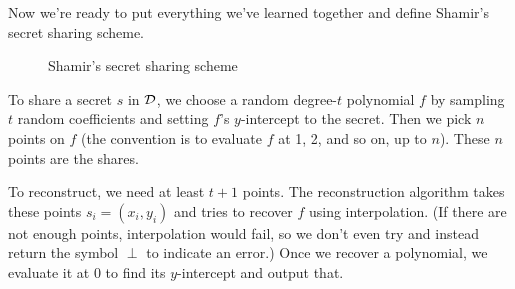 Now we're ready to put everything we've learned together and define 
Shamir's secret sharing scheme\footnotemark.

\begin{figure}[h!]
\begin{pchstack}[center]
\end{pchstack}
\caption{Shamir's secret sharing scheme}
\label{fig:shamirSS}
\end{figure}

To share a secret $s$ in $\mathcal{D}$, we choose a random 
degree-$t$ polynomial $f$ by sampling $t$ random coefficients and 
setting $f$'s $y$-intercept to the secret. Then we pick $n$ points 
on $f$ (the convention is to evaluate $f$ at 1, 2, and so on, up 
to $n$)\footnotemark. These $n$ points are the shares.

To reconstruct, we need at least $t+1$ points. The reconstruction 
algorithm takes these points $s_i = (x_i, y_i)$ and tries to recover 
$f$ using interpolation. (If there are not enough points, interpolation 
would fail, so we don't even try and instead return the symbol $\perp$ to indicate an error.)
Once we recover a polynomial, we evaluate it at 0 to find its 
$y$-intercept and output that.

